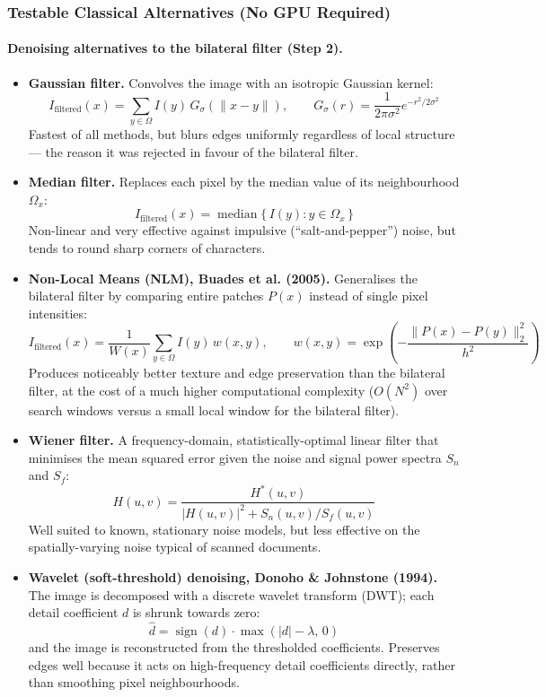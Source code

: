 \documentclass[12pt, a4paper]{article}
\begin{document}
\subsubsection*{Testable Classical Alternatives (No GPU Required)}

\paragraph{Denoising alternatives to the bilateral filter (Step 2).}

\begin{itemize}
  \item \textbf{Gaussian filter.} Convolves the image with an isotropic Gaussian kernel:
  \[
  I_{\text{filtered}}(x) = \sum_{y \in \Omega} I(y)\, G_\sigma(\|x-y\|), \qquad G_\sigma(r) = \frac{1}{2\pi\sigma^2} e^{-r^2/2\sigma^2}
  \]
  Fastest of all methods, but blurs edges uniformly regardless of local structure --- the reason it was rejected in favour of the bilateral filter.

  \item \textbf{Median filter.} Replaces each pixel by the median value of its neighbourhood $\Omega_x$:
  \[
  I_{\text{filtered}}(x) = \operatorname{median}\{\, I(y) : y \in \Omega_x \,\}
  \]
  Non-linear and very effective against impulsive (``salt-and-pepper'') noise, but tends to round sharp corners of characters.

  \item \textbf{Non-Local Means (NLM), Buades et al. (2005).} Generalises the bilateral filter by comparing entire patches $P(x)$ instead of single pixel intensities:
  \[
  I_{\text{filtered}}(x) = \frac{1}{W(x)} \sum_{y \in \Omega} I(y)\, w(x,y), \qquad w(x,y) = \exp\!\left(-\frac{\|P(x)-P(y)\|_2^2}{h^2}\right)
  \]
  Produces noticeably better texture and edge preservation than the bilateral filter, at the cost of a much higher computational complexity ($O(N^2)$ over search windows versus a small local window for the bilateral filter).

  \item \textbf{Wiener filter.} A frequency-domain, statistically-optimal linear filter that minimises the mean squared error given the noise and signal power spectra $S_n$ and $S_f$:
  \[
  H(u,v) = \frac{H^{*}(u,v)}{|H(u,v)|^{2} + S_n(u,v)/S_f(u,v)}
  \]
  Well suited to known, stationary noise models, but less effective on the spatially-varying noise typical of scanned documents.

  \item \textbf{Wavelet (soft-threshold) denoising, Donoho \& Johnstone (1994).} The image is decomposed with a discrete wavelet transform (DWT); each detail coefficient $d$ is shrunk towards zero:
  \[
  \hat{d} = \operatorname{sign}(d)\cdot\max(|d| - \lambda,\, 0)
  \]
  and the image is reconstructed from the thresholded coefficients. Preserves edges well because it acts on high-frequency detail coefficients directly, rather than smoothing pixel neighbourhoods.


\end{itemize}
\end{document}
